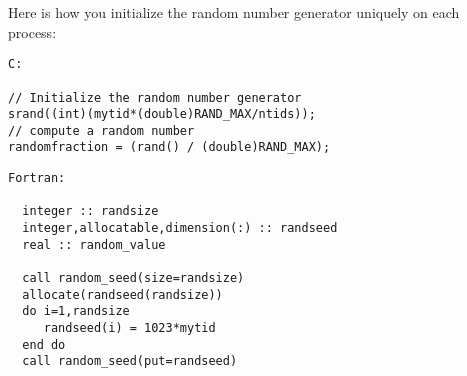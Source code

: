 
Here is how you initialize the random number generator uniquely on each process:

{\footnotesize
\begin{verbatim}
C:

// Initialize the random number generator
srand((int)(mytid*(double)RAND_MAX/ntids));
// compute a random number
randomfraction = (rand() / (double)RAND_MAX);
\end{verbatim}
\begin{verbatim}
Fortran:

  integer :: randsize
  integer,allocatable,dimension(:) :: randseed
  real :: random_value

  call random_seed(size=randsize)
  allocate(randseed(randsize))
  do i=1,randsize
     randseed(i) = 1023*mytid
  end do
  call random_seed(put=randseed)
\end{verbatim}
}

